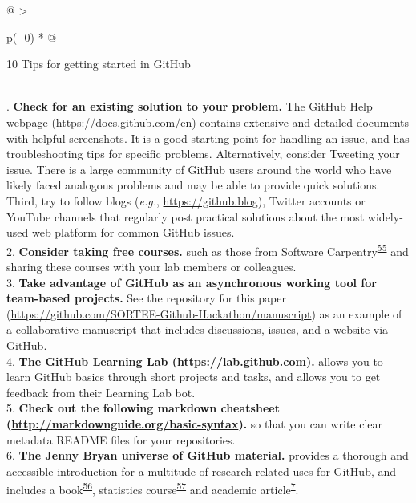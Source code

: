 \begin{tablenos:no-prefix-table-caption}

\begin{longtable}[]{@{}
  >{\raggedright\arraybackslash}p{(\columnwidth - 0\tabcolsep) * }@{}}
\toprule
\begin{minipage}[b]{\linewidth}\raggedright
10 Tips for getting started in GitHub
\end{minipage} \\
\midrule
{}. \textbf{Check for an existing solution to your problem.} The GitHub Help webpage (\url{https://docs.github.com/en}) contains extensive and detailed documents with helpful screenshots. It is a good starting point for handling an issue, and has troubleshooting tips for specific problems. Alternatively, consider Tweeting your issue. There is a large community of GitHub users around the world who have likely faced analogous problems and may be able to provide quick solutions. Third, try to follow blogs (\emph{e.g.}, \url{https://github.blog}), Twitter accounts or YouTube channels that regularly post practical solutions about the most widely-used web platform for common GitHub issues. \\
2. \textbf{Consider taking free courses.} such as those from Software Carpentry\textsuperscript{\protect\hyperlink{ref-pjy75gHr}{55}} and sharing these courses with your lab members or colleagues. \\
3. \textbf{Take advantage of GitHub as an asynchronous working tool for team-based projects.} See the repository for this paper (\url{https://github.com/SORTEE-Github-Hackathon/manuscript}) as an example of a collaborative manuscript that includes discussions, issues, and a website via GitHub. \\
4. \textbf{The GitHub Learning Lab (\url{https://lab.github.com}).} allows you to learn GitHub basics through short projects and tasks, and allows you to get feedback from their Learning Lab bot. \\
5. \textbf{Check out the following markdown cheatsheet (\url{http://markdownguide.org/basic-syntax}).} so that you can write clear metadata README files for your repositories. \\
6. \textbf{The Jenny Bryan universe of GitHub material.} provides a thorough and accessible introduction for a multitude of research-related uses for GitHub, and includes a book\textsuperscript{\protect\hyperlink{ref-ZvrOcg9w}{56}}, statistics course\textsuperscript{\protect\hyperlink{ref-6CMMeSeD}{57}} and academic article\textsuperscript{\protect\hyperlink{ref-RVetqmsg}{7}}. \\

\end{longtable}
\end{tablenos:no-prefix-table-caption}
